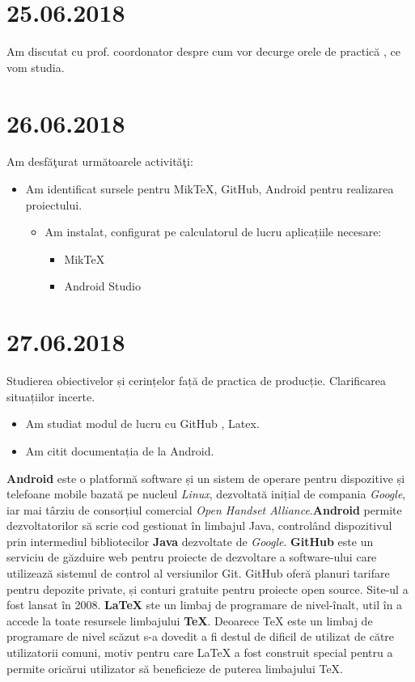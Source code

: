 \documentclass{report}
\begin{document}
\chapter{25.06.2018}
Am discutat cu prof. coordonator despre cum vor decurge orele de practică , ce vom studia.

\chapter{26.06.2018}
Am desfăţurat următoarele activităţi:
\begin{itemize}
\item
Am identificat sursele pentru MikTeX, GitHub, Android pentru realizarea proiectului.
\begin{itemize}
\item
Am instalat, configurat pe calculatorul de lucru aplicațiile necesare:
\begin{itemize}
\item
MikTeX
\item
Android Studio 
\end{itemize}
\end{itemize}
\end{itemize}

\chapter{27.06.2018}

\vskip 0.5cm
Studierea obiectivelor și cerințelor față de practica de producție. Clarificarea situațiilor incerte.
\begin{itemize}
    \item  Am studiat modul de lucru cu GitHub , Latex.
    \item Am citit documentația de la Android.
\end{itemize}

\vskip 0.5cm
\textbf{ Android} este o platformă software și un sistem de operare pentru dispozitive și telefoane mobile bazată pe nucleul \textit{Linux}, dezvoltată inițial de compania \textit{Google}, iar mai târziu de consorțiul comercial \textit{ Open Handset Alliance}.\textbf{Android} permite dezvoltatorilor să scrie cod gestionat în limbajul Java, controlând dispozitivul prin intermediul bibliotecilor \textbf{Java} dezvoltate de \textit{Google}.
\vskip 0.5cm
\textbf{GitHub} este un serviciu de găzduire web pentru proiecte de dezvoltare a software-ului care utilizează sistemul de control al versiunilor Git. GitHub oferă planuri tarifare pentru depozite private, și conturi gratuite pentru proiecte open source. Site-ul a fost lansat în 2008.
\vskip 0.5cm
\textbf{LaTeX} ste un limbaj de programare de nivel-înalt, util în a accede la toate resursele limbajului \textbf{TeX}. Deoarece TeX este un limbaj de programare de nivel scăzut s-a dovedit a fi destul de dificil de utilizat de către utilizatorii comuni, motiv pentru care LaTeX a fost construit special pentru a permite oricărui utilizator să beneficieze de puterea limbajului TeX.
\end{document}
